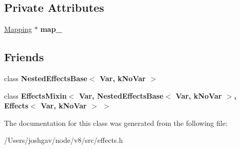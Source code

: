\subsection*{Private Attributes}
\begin{DoxyCompactItemize}
\item 
\hyperlink{classv8_1_1internal_1_1_zone_splay_tree}{Mapping} $\ast$ {\bfseries map\+\_\+}\hypertarget{classv8_1_1internal_1_1_effects_base_a59fb39e157298bc2e6d64d0b59e71dc1}{}\label{classv8_1_1internal_1_1_effects_base_a59fb39e157298bc2e6d64d0b59e71dc1}

\end{DoxyCompactItemize}
\subsection*{Friends}
\begin{DoxyCompactItemize}
\item 
class {\bfseries Nested\+Effects\+Base$<$ Var, k\+No\+Var $>$}\hypertarget{classv8_1_1internal_1_1_effects_base_ab162a9ef7065fbbada1e8cba47e4431d}{}\label{classv8_1_1internal_1_1_effects_base_ab162a9ef7065fbbada1e8cba47e4431d}

\item 
class {\bfseries Effects\+Mixin$<$ Var, Nested\+Effects\+Base$<$ Var, k\+No\+Var $>$, Effects$<$ Var, k\+No\+Var $>$ $>$}\hypertarget{classv8_1_1internal_1_1_effects_base_a4453a632029cb5c80a2df00b9b2adb67}{}\label{classv8_1_1internal_1_1_effects_base_a4453a632029cb5c80a2df00b9b2adb67}

\end{DoxyCompactItemize}


The documentation for this class was generated from the following file\+:\begin{DoxyCompactItemize}
\item 
/\+Users/joshgav/node/v8/src/effects.\+h\end{DoxyCompactItemize}
